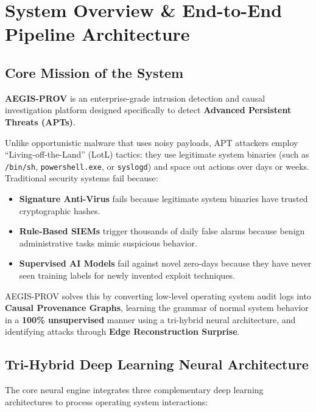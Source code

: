\documentclass[11pt,a4paper]{report}
\begin{document}
\chapter{System Overview \& End-to-End Pipeline Architecture}

\section{Core Mission of the System}
\textbf{AEGIS-PROV} is an enterprise-grade intrusion detection and causal investigation platform designed specifically to detect \textbf{Advanced Persistent Threats (APTs)}. 

Unlike opportunistic malware that uses noisy payloads, APT attackers employ ``Living-off-the-Land'' (LotL) tactics: they use legitimate system binaries (such as \texttt{/bin/sh}, \texttt{powershell.exe}, or \texttt{syslogd}) and space out actions over days or weeks. Traditional security systems fail because:
\begin{itemize}
    \item \textbf{Signature Anti-Virus} fails because legitimate system binaries have trusted cryptographic hashes.
    \item \textbf{Rule-Based SIEMs} trigger thousands of daily false alarms because benign administrative tasks mimic suspicious behavior.
    \item \textbf{Supervised AI Models} fail against novel zero-days because they have never seen training labels for newly invented exploit techniques.
\end{itemize}

AEGIS-PROV solves this by converting low-level operating system audit logs into \textbf{Causal Provenance Graphs}, learning the grammar of normal system behavior in a \textbf{100\% unsupervised} manner using a tri-hybrid neural architecture, and identifying attacks through \textbf{Edge Reconstruction Surprise}.

\section{Tri-Hybrid Deep Learning Neural Architecture}
The core neural engine integrates three complementary deep learning architectures to process operating system interactions:
\end{document}
